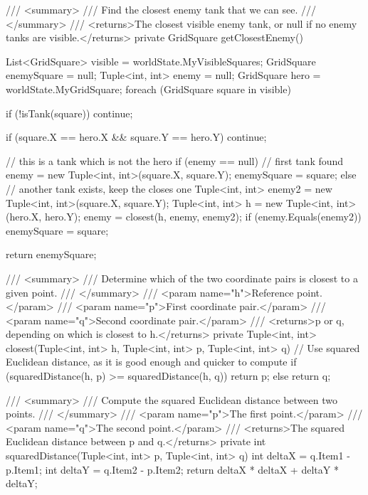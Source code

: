 \documentclass[11pt]{article}
\begin{document}
\begin{code}
{{        /// <summary>
        /// Find the closest enemy tank that we can see.
        /// </summary>
        /// <returns>The closest visible enemy tank, or null if no enemy tanks are visible.</returns>
        private GridSquare getClosestEnemy()
        {
            List<GridSquare> visible = worldState.MyVisibleSquares;
            GridSquare enemySquare = null;
            Tuple<int, int> enemy = null;
            GridSquare hero = worldState.MyGridSquare;
            foreach (GridSquare square in visible)
            {
                if (!isTank(square))
                {
                    continue;
                }

                if (square.X == hero.X && square.Y == hero.Y)
                {
                    continue;
                }

                // this is a tank which is not the hero
                if (enemy == null)
                {
                    // first tank found
                    enemy = new Tuple<int, int>(square.X, square.Y);
                    enemySquare = square;
                }
                else
                {
                    // another tank exists, keep the closes one
                    Tuple<int, int> enemy2 = new Tuple<int, int>(square.X, square.Y);
                    Tuple<int, int> h = new Tuple<int, int>(hero.X, hero.Y);
                    enemy = closest(h, enemy, enemy2);
                    if (enemy.Equals(enemy2))
                    {
                        enemySquare = square;
                    }
                }
            }
            return enemySquare;
        }

        /// <summary>
        /// Determine which of the two coordinate pairs is closest to a given point.
        /// </summary>
        /// <param name="h">Reference point.</param>
        /// <param name="p">First coordinate pair.</param>
        /// <param name="q">Second coordinate pair.</param>
        /// <returns>p or q, depending on which is closest to h.</returns>
        private Tuple<int, int> closest(Tuple<int, int> h, Tuple<int, int> p, Tuple<int, int> q)
        {
            // Use squared Euclidean distance, as it is good enough and quicker to compute
            if (squaredDistance(h, p) >= squaredDistance(h, q))
            {
                return p;
            }
            else
            {
                return q;
            }
        }

        /// <summary>
        /// Compute the squared Euclidean distance between two points.
        /// </summary>
        /// <param name="p">The first point.</param>
        /// <param name="q">The second point.</param>
        /// <returns>The squared Euclidean distance between p and q.</returns>
        private int squaredDistance(Tuple<int, int> p, Tuple<int, int> q)
        {
            int deltaX = q.Item1 - p.Item1;
            int deltaY = q.Item2 - p.Item2;
            return deltaX * deltaX + deltaY * deltaY;
        }

}}
\end{code}
\end{document}
